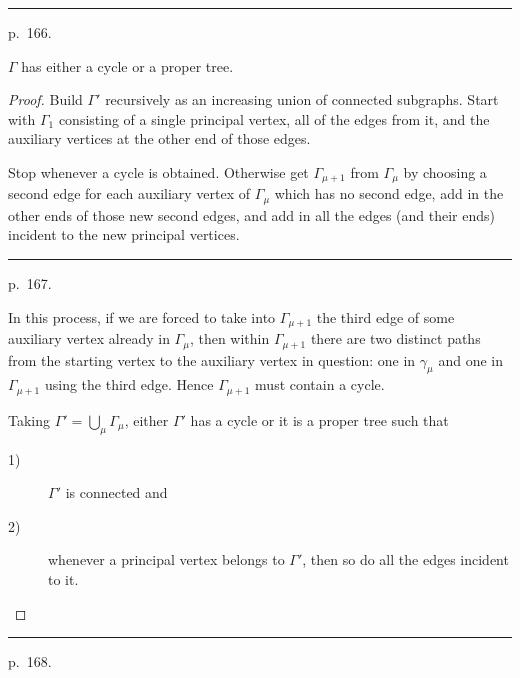 \documentclass{amsart}
\theoremstyle{plain}
\theoremstyle{definition}
\begin{document}
\medskip
\hrule\smallskip
\noindent p.~166.
\medskip

\begin{lem}\label{Lemma 16} $\Gamma$ has either a cycle or a
proper tree.
\end{lem}
\begin{proof} Build $\Gamma'$ recursively as an increasing
union of connected subgraphs. Start with $\Gamma_1$
consisting of a single principal vertex, all of the edges from
it, and the auxiliary vertices at the other end of those edges.

Stop whenever a cycle is obtained. Otherwise get
$\Gamma_{\mu +1}$ from $\Gamma_\mu$ by choosing a second
edge for each auxiliary vertex of $\Gamma_\mu$ which has
no second edge, add in the other ends of those new second
edges, and add in all the edges (and their ends) incident to
the new principal vertices.

\medskip
\hrule\smallskip
\noindent p.~167.
\medskip

In this process, if we are forced to take into $\Gamma_{\mu+1}$
the third edge of some auxiliary vertex already in $\Gamma_\mu$,
then within $\Gamma_{\mu+1}$ there are two distinct paths
from the starting vertex to the auxiliary vertex in question:
one in $\gamma_\mu$ and one in $\Gamma_{\mu+1}$ using
the third edge. Hence $\Gamma_{\mu+1}$ must contain a cycle.

Taking $\Gamma' = \bigcup_\mu \Gamma_\mu$, either
$\Gamma'$ has a cycle or it is a proper tree such that
\begin{description}
\item[1)] $\Gamma'$ is connected and
\item[2)] whenever a principal vertex belongs to $\Gamma'$,
then so do all the edges incident to it.
\end{description}
\end{proof}

\medskip
\hrule\smallskip
\noindent p.~168.
\medskip
\end{document}
